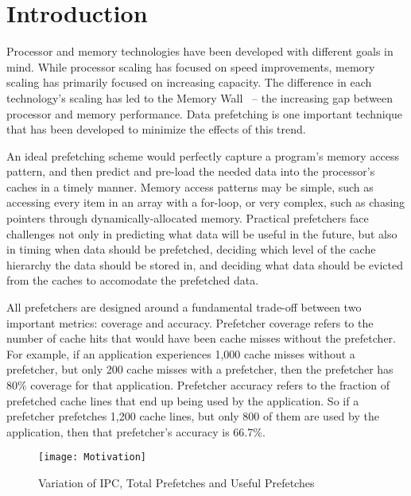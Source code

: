 \section{Introduction}
\label{Introduction}

Processor and memory technologies have been developed with different
goals in mind.  While processor scaling has focused on speed improvements,
memory scaling has primarily focused on increasing capacity.  The
difference in each technology's scaling has led to the Memory Wall~\cite{MemWall}
-- the increasing gap between processor and memory performance. Data prefetching
is one important technique that has been developed to minimize the effects 
of this trend.


An ideal prefetching scheme would perfectly capture a program's memory access pattern, and then
predict and pre-load the needed data into the processor's caches in a timely manner. 
Memory access patterns may be simple, such as accessing every item in an array with a for-loop,
or very complex, such as chasing pointers through dynamically-allocated memory.
Practical prefetchers face challenges not only in predicting what data will be useful in the future,
but also in timing when data should be prefetched, deciding which level of the cache hierarchy
the data should be stored in, and deciding what data should be evicted from the caches to accomodate
the prefetched data.

All prefetchers are designed around a fundamental trade-off between two important metrics:
coverage and accuracy.  Prefetcher coverage refers to the number of cache hits that would have
been cache misses without the prefetcher.  For example, if an application experiences 1,000 cache misses
without a prefetcher, but only 200 cache misses with a prefetcher, then the prefetcher has 80\%
coverage for that application.  Prefetcher accuracy refers to the fraction of prefetched cache lines
that end up being used by the application.  So if a prefetcher prefetches 1,200 cache lines, 
but only 800 of them are used by the application, then that prefetcher's accuracy is 66.7\%.


\begin{figure}[t]
\texttt{[image: Motivation]}
\caption{Variation of IPC, Total Prefetches and Useful Prefetches}
\label{Fig:Motivation}
\end{figure}

